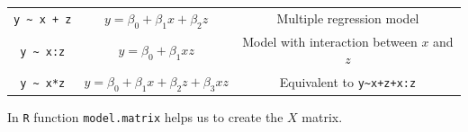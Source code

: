 \documentclass[]{article}
\newenvironment{Shaded}{\begin{snugshade}}{\end{snugshade}}
\newcommand{\KeywordTok}[1]{\textcolor[rgb]{0.13,0.29,0.53}{\textbf{{#1}}}}
\newcommand{\DataTypeTok}[1]{\textcolor[rgb]{0.13,0.29,0.53}{{#1}}}
\newcommand{\StringTok}[1]{\textcolor[rgb]{0.31,0.60,0.02}{{#1}}}
\newcommand{\NormalTok}[1]{{#1}}
\numberwithin{equation}{section}
\begin{document}
\begin{longtable}[c]{@{}ccc@{}}
\begin{minipage}[t]{0.27\columnwidth}
\texttt{y\ \textasciitilde{}\ x\ +\ z}
\strut\end{minipage} &
\begin{minipage}[t]{0.55\columnwidth}\centering\strut
\(y = \beta_0+\beta_1x+\beta_2z\)
\strut\end{minipage} &
\begin{minipage}[t]{0.90\columnwidth}\centering\strut
Multiple regression model
\strut\end{minipage}\tabularnewline
\begin{minipage}[t]{0.27\columnwidth}\centering\strut
\texttt{y\ \textasciitilde{}\ x:z}
\strut\end{minipage} &
\begin{minipage}[t]{0.55\columnwidth}\centering\strut
\(y = \beta_0+\beta_1xz\)
\strut\end{minipage} &
\begin{minipage}[t]{0.90\columnwidth}\centering\strut
Model with interaction between \(x\) and \(z\)
\strut\end{minipage}\tabularnewline
\begin{minipage}[t]{0.27\columnwidth}\centering\strut
\texttt{y\ \textasciitilde{}\ x*z}
\strut\end{minipage} &
\begin{minipage}[t]{0.55\columnwidth}\centering\strut
\(y = \beta_0+\beta_1x+\beta_2z+\beta_3xz\)
\strut\end{minipage} &
\begin{minipage}[t]{0.90\columnwidth}\centering\strut
Equivalent to \texttt{y\textasciitilde{}x+z+x:z}
\strut\end{minipage}\tabularnewline
\bottomrule
\end{longtable}

In \texttt{R} function \texttt{model.matrix} helps us to create the
\(X\) matrix.

\begin{Shaded}
\end{Shaded}
\end{document}
